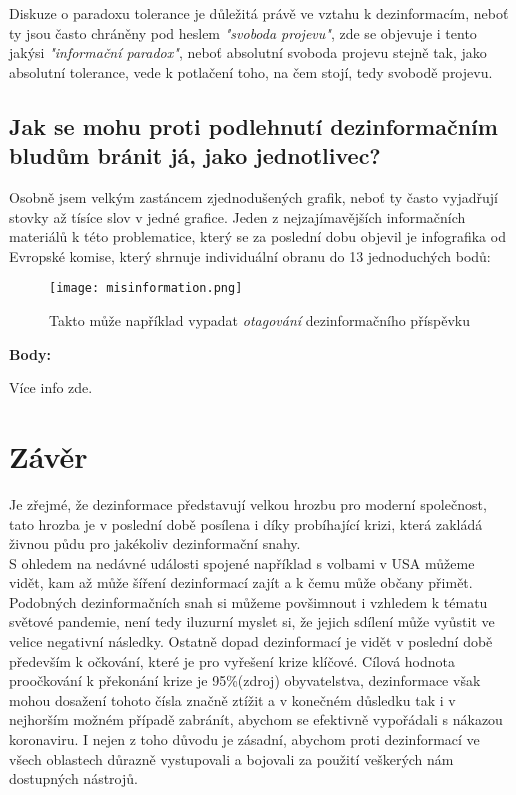 Diskuze o paradoxu tolerance je důležitá právě ve vztahu k dezinformacím, neboť ty jsou často chráněny pod heslem \textit{"svoboda projevu"}, zde se objevuje i tento jakýsi \textit{"informační paradox"}, neboť absolutní svoboda projevu stejně tak, jako absolutní tolerance, vede k potlačení toho, na čem stojí, tedy svobodě projevu.\\

\subsection{Jak se mohu proti podlehnutí dezinformačním bludům bránit já, jako jednotlivec?}

Osobně jsem velkým zastáncem zjednodušených grafik, neboť ty často vyjadřují stovky až tísíce slov v jedné grafice. Jeden z nejzajímavějších informačních materiálů k této problematice, který se za poslední dobu objevil je infografika od Evropské komise, který shrnuje individuální obranu do 13 jednoduchých bodů:\\


\begin{figure}[htbp]
  \centering
  \texttt{[image: misinformation.png]}
  \caption{Takto může například vypadat \textit{otagování} dezinformačního příspěvku\cite{}}
  \label{fig:disputed_claim}
\end{figure}

\textbf{Body:}

Více info zde\cite{}.

\newpage

\section{Závěr}

Je zřejmé, že dezinformace představují velkou hrozbu pro moderní společnost, tato hrozba je v poslední době posílena i díky probíhající krizi, která zakládá živnou půdu pro jakékoliv dezinformační snahy.\\

S ohledem na nedávné události spojené například s volbami v USA můžeme vidět, kam až může šíření dezinformací zajít a k čemu může občany přimět.\\

Podobných dezinformačních snah si můžeme povšimnout i vzhledem k tématu světové pandemie, není tedy iluzurní myslet si, že jejich sdílení může vyůstit ve velice negativní následky. Ostatně dopad dezinformací je vidět v poslední době především k očkování, které je pro vyřešení krize klíčové. Cílová hodnota proočkování k překonání krize je 95\%(zdroj) obyvatelstva, dezinformace však mohou dosažení tohoto čísla značně ztížit a v konečném důsledku tak i v nejhorším možném případě zabránít, abychom se efektivně vypořádali s nákazou koronaviru. I nejen z toho důvodu je zásadní, abychom proti dezinformací ve všech oblastech důrazně vystupovali a bojovali za použití veškerých nám dostupných nástrojů.\\

